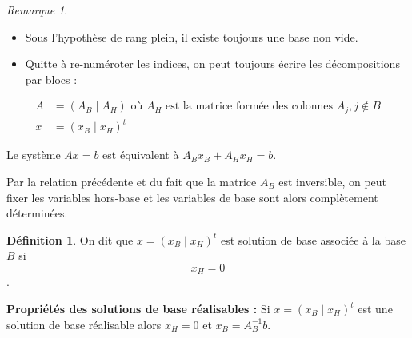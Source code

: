 \documentclass[a4paper,12pt,openany]{book}
\theoremstyle{plain}
\theoremstyle{definition}
\newtheorem{definition}[theorem]{Définition}
\theoremstyle{remark}
\newtheorem{remarque}[theorem]{Remarque}
\theoremstyle{nbstyle}
\begin{document}
	\begin{remarque}
		\begin{itemize}
			\item Sous l'hypothèse de rang plein, il existe toujours une base non vide.
			\item Quitte à re-numéroter les indices, on peut toujours écrire les décompositions par blocs :
		\end{itemize}
	\end{remarque}
	\label{rem:2.2}
	
	$$
	\begin{aligned}
	A & =\left(A_{B} \mid A_{H}\right) \text { où } A_{H} \text { est la matrice formée des colonnes } A_{j}, j \notin B \\
	x & =\left(x_{B} \mid x_{H}\right)^{t}
	\end{aligned}
	$$
	
	Le système $A x=b$ est équivalent à $A_{B} x_{B}+A_{H} x_{H}=b$.
	
	Par la relation précédente et du fait que la matrice $A_{B}$ est inversible, on peut fixer les variables hors-base et les variables de base sont alors complètement déterminées.
	
	\begin{definition}
		On dit que $x=\left(x_{B} \mid x_{H}\right)^{t}$ est solution de base associée à la base $B$ si $$ x_{H}=0 $$.
	\end{definition}
	\label{def:2.3}
	
	\textbf{Propriétés des solutions de base réalisables :} Si $x=\left(x_{B} \mid x_{H}\right)^{t}$ est une solution de base réalisable alors $x_{H}=0$ et $x_{B}=A_{B}^{-1} b$.
	
\end{document}
